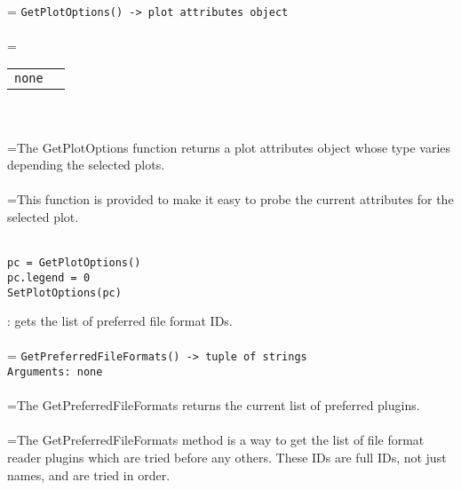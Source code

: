 \documentclass[10pt,a4paper]{report}
\begin{document}
 \\ 
\hangindent=\parindent 
\verb!GetPlotOptions() -> plot attributes object!\\ [-3mm]

 \\ 
\hangindent=\parindent 
\begin{tabular}{ll}
\verb!none! &  \\
\end{tabular} \\[-2mm]


 \\ 
\hangindent=\parindent The GetPlotOptions function returns a plot attributes object whose type varies depending the selected plots. \\[-3mm] 

 \\ 
\hangindent=\parindent This function is provided to make it easy to probe the current attributes for the selected plot. \\[-3mm] 

\\[-6mm]
\begin{verbatim}pc = GetPlotOptions()
pc.legend = 0
SetPlotOptions(pc)
\end{verbatim}
\newpage


{}
: gets the list of preferred file format IDs.\\[-3mm]

 \\ 
\hangindent=\parindent 
\verb!GetPreferredFileFormats() -> tuple of strings!\\ 
\verb!Arguments: none!\\ [-3mm]

 \\ 
\hangindent=\parindent The GetPreferredFileFormats returns the current list of preferred plugins. \\[-3mm] 

 \\ 
\hangindent=\parindent The GetPreferredFileFormats method is a way to get the list of file format reader plugins which are tried before any others. These IDs are full IDs, not just names, and are tried in order. \\[-3mm] 
\end{document}
